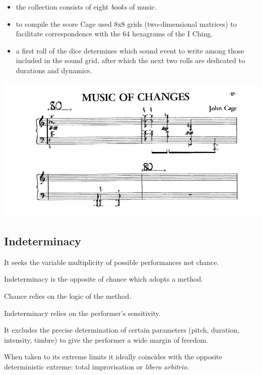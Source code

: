 \begin{itemize}
  \begin{itemize}
  \tightlist
  \item the collection consists of eight \textit{books} of music.
  \item to compile the score Cage used 8x8 grids (two-dimensional matrices) to facilitate correspondence with the 64 hexagrams of the I Ching.
  \item a first roll of the dice determines which sound event to write among those included in the sound grid, after which the next two rolls are dedicated to durations and dynamics.
  \end{itemize}
  
  \begin{center}
  \includegraphics[scale=0.4]{../img/Music_O_C.png}
  \end{center}
\end{itemize}

\subsection{Indeterminacy}\label{indeterminacy}

It seeks the variable multiplicity of possible performances not chance.

Indeterminacy is the opposite of chance which adopts a method.

Chance relies on the logic of the method.

Indeterminacy relies on the performer's sensitivity.

It excludes the precise determination of certain parameters (pitch, duration, intensity, timbre) to give the performer a wide margin of freedom.

When taken to its extreme limits it ideally coincides with the opposite deterministic extreme: total improvisation or \textit{libero arbitrio}.

